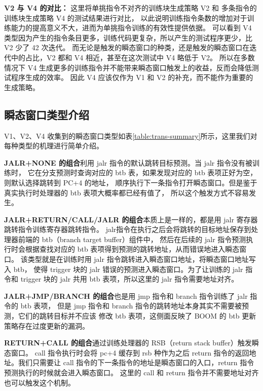 \textbf{V2 与 V4 的对比：}
这里将单挑指令不对齐的训练块生成策略 V2 和 多条指令的训练块生成策略 V4 的测试结果进行对比，
以此说明训练指令条数的增加对于训练能力的提高意义不大，进而为单挑指令训练的有效性提供依据。
可以看到 V4 类型因为产生的指令条目更多，训练代码更复杂，所以产生的测试程序更少，比 V2 少了 42 次迭代。
而无论是触发的瞬态窗口的种类，还是触发的瞬态窗口在迭代中的占比，V2 都和 V4 相近，甚至在这次测试中 V4 略低于 V2。
所以在多数情况下 V4 生成更多的训练指令并不能带来瞬态窗口触发上的收益，反而会降低测试程序生成的效率。
因此 V4 应该仅作为 V1 和 V2 的补充，而不能作为重要的生成策略。\par

\subsection{瞬态窗口类型介绍}

V1、V2、V4 收集到的瞬态窗口类型如表\ref{table:trans-summary}所示，这里我们对每种类型的机理进行简单介绍。\par

\textbf{JALR+NONE 的组合}利用 jalr 指令的默认跳转目标预测。当 jalr 指令没有被训练时，
它在分支预测时查询对应的 btb 表，如果发现对应的 btb 表项正好为空，则默认选择跳转到 PC+4 的地址，
顺序执行下一条指令打开瞬态窗口。但是鉴于真实执行时处理器的 btb 表项大概率都已经有值了，
所以这个触发方式不容易发生。\par

\textbf{JALR+RETURN/CALL/JALR 的组合}本质上是一样的，都是用 jalr 寄存器跳转指令训练寄存器跳转指令。
jalr指令在执行之后会将跳转的目标地址保存到处理器前端的 btb（branch target buffer）组件中，
然后在后续的 jalr 指令预测执行时会根据查找对应的 btb 表项得到预测的跳转地址，从而错误地进入瞬态窗口。
该类型就是在训练时用 jalr 指令跳转进入瞬态窗口地址，将瞬态窗口地址写入 btb，
使得 trigger 块的 jalr 错误的预测进入瞬态窗口。为了让训练的 jalr 指令和 trigger 块的 jalr
共用 btb 表项，所以这里的 jalr 指令需要地址对齐。\par

\textbf{JALR+JMP/BRANCH 的组合}也是用 jmp 指令和 branch 指令训练了 jalr 指令的 btb 表项，
但是 jmp 指令和 branch 指令的跳转地址本身其实不需要被预测，它们的跳转目标并不应该
修改 btb 表项，这侧面反映了 BOOM 的 btb 更新策略存在过度更新的漏洞。\par

\textbf{RETURN+CALL 的组合}通过训练处理器的 RSB（return stack buffer）触发瞬态窗口。
call 指令执行时会将 pc+4 缓存到 rsb 种作为之后 return 指令的返回地址。我们只需要让
call 指令的下一条指令的地址是瞬态窗口的入口，return 指令预测执行的时候就会进入瞬态窗口。
这里的 call 和 return 指令并不需要地址对齐也可以触发这个机制。\par

